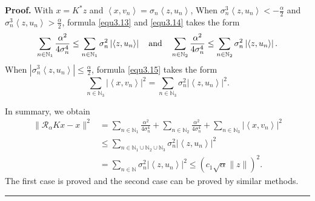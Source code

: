 \documentclass[a4paper,12pt]{article}
\numberwithin{equation}{section}
\newenvironment{proof}[1][Proof]{\textbf{#1.} }
{\ \rule{0.75em}{0.75em}\smallskip}
\begin{document}
\begin{proof}
    With $x=K^{*}z$ and $\left<x,v_{n}\right>=\sigma_{n}\left<z,u_{n}\right>$, When $\sigma_{n}^3\left<z,u_{n}\right> < -\frac{\alpha}{2}$ and $\sigma_{n}^3\left<z,u_{n}\right> > \frac{\alpha}{2}$,
    formula \eqref{equ3.13} and \eqref{equ3.14} takes the form
    \begin{equation*}
        \sum_{n\in\mathbb{N}_{1}}\frac{\alpha^{2}}{4\sigma_{n}^{4}}\leq \sum_{n\in\mathbb{N}_{1}}\sigma_{n}^{2}\left| \left<z,u_{n}\right>\right|\quad {\rm and} \quad \sum_{n\in\mathbb{N}_{2}}\frac{\alpha^{2}}{4\sigma_{n}^{4}}\leq \sum_{n\in\mathbb{N}_{2}}\sigma_{n}^{2}\left| \left<z,u_{n}\right>\right|.
    \end{equation*}
    When $|\sigma_{n}^3\left<z,u_{n}\right>|\leq \frac{\alpha}{2}$, formula \eqref{equ3.15} takes the form
    \begin{equation*}
        \sum_{n\in\mathbb{N}_{3}}|\left<x,v_{n}\right>|^2= \sum_{n\in\mathbb{N}_{3}}\sigma_{n}^{2}|\left<z,u_{n}\right>|^2.
    \end{equation*}
    \par In summary, we obtain
    \begin{align*}
        \|\mathcal{R}_{\alpha}Kx-x\|^2
        & =\sum_{n\in\mathbb{N}_{1}}\frac{\alpha^{2}}{4\sigma_{n}^{4}}+ \sum_{n\in\mathbb{N}_{2}}\frac{\alpha^{2}}{4\sigma_{n}^{4}}+ \sum_{n\in\mathbb{N}_{3}}|\left<x,v_{n}\right>|^2  \\
        & \leq \sum_{n\in\mathbb{N}_{1}\cup\mathbb{N}_{2}\cup\mathbb{N}_{3}} \sigma_{n}^{2}|\left<z,u_{n}\right>|^2 \\
        & = \sum_{n\in\mathbb{N}} \sigma_{n}^{2}|\left<z,u_{n}\right>|^2 \leq (c_{1}\sqrt{\alpha}\|z\|)^{2}.
    \end{align*}
    The first case is proved and the second case can be proved by similar methods.
\end{proof}
\end{document}
